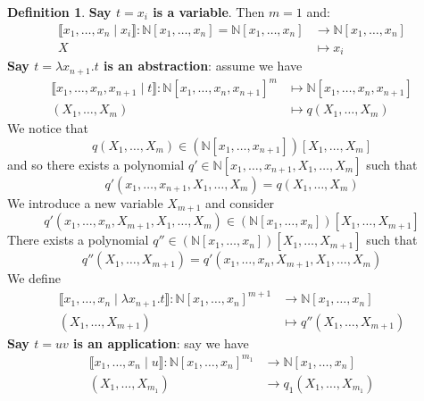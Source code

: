 \documentclass[12pt]{article}
\theoremstyle{plain}
\theoremstyle{definition}
\newtheorem{defn}[thm]{Definition} %
\newcommand{\bb}[1]{\mathbb{#1}}
\newcommand{\lto}{\longrightarrow}
\begin{document}
	\begin{defn}
		\textbf{Say $t = x_i$ is a variable}. Then $m = 1$ and:
		\begin{align*}
			\llbracket x_1, \ldots, x_n \mid x_i \rrbracket: \bb{N}[x_1, \ldots, x_n] = \bb{N}[x_1, \ldots, x_n] &\lto \bb{N}[x_1, \ldots, x_n]\\
			X &\longmapsto x_i
			\end{align*}
		\textbf{Say $t = \lambda x_{n+1}. t$ is an abstraction}: assume we have
		\begin{align*}
			\llbracket x_1, \ldots, x_n, x_{n+1} \mid t \rrbracket: \bb{N}[x_1, \ldots, x_n, x_{n+1}]^{m} &\longmapsto \bb{N}[x_1, \ldots, x_{n}, x_{n+1}]\\
			(X_1, \ldots, X_{m}) &\longmapsto q(X_1, \ldots, X_{m})
			\end{align*}
		We notice that
		\begin{equation}
			q(X_1, \ldots, X_{m}) \in (\bb{N}[x_1, \ldots, x_{n+1}])[X_1, \ldots, X_{m}]
			\end{equation}
		and so there exists a polynomial $q' \in \bb{N}[x_1, \ldots, x_{n+1}, X_1, \ldots, X_{m}]$ such that
		\begin{equation}
			q'(x_1, \ldots, x_{n+1}, X_1, \ldots, X_{m}) = q(X_1, \ldots, X_{m})
			\end{equation}
		We introduce a new variable $X_{m+1}$ and consider
		\begin{equation}
			q'(x_1, \ldots, x_{n}, X_{m+1}, X_1, \ldots, X_{m}) \in (\bb{N}[x_1, \ldots, x_n])[X_1, \ldots, X_{m+1}]
			\end{equation}
		There exists a polynomial $q'' \in (\bb{N}[x_1, \ldots, x_n])[X_1, \ldots, X_{m+1}]$ such that
		\begin{equation}
			q''(X_1, \ldots, X_{m+1}) = q'(x_1, \ldots, x_n, X_{m+1}, X_1, \ldots, X_{m})
			\end{equation}
		We define
		\begin{align*}
			\llbracket x_1, \ldots, x_n \mid \lambda x_{n+1}. t\rrbracket: \bb{N}[x_1, \ldots, x_{n}]^{m+1} &\lto \bb{N}[x_1, \ldots, x_n]\\
			(X_1, \ldots, X_{m+1}) &\longmapsto q''(X_1, \ldots, X_{m+1})
			\end{align*}
		\textbf{Say $t = uv$ is an application}: say we have
		\begin{align*}
			\llbracket x_1,\ldots, x_n \mid u \rrbracket: \bb{N}[x_1, \ldots, x_n]^{m_1} &\lto \bb{N}[x_1, \ldots, x_n]\\
			(X_1, \ldots, X_{m_1}) &\lto q_1(X_1, \ldots, X_{m_1})

\end{align*}
\end{defn}
\end{document}
